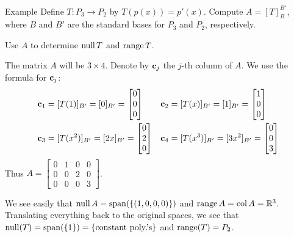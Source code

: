 \begin{frame}{Example}
Define $T\colon P_{3}\rightarrow P_{2}$ by $T(p(x))=p'(x)$. Compute $A=[T]_{B}^{B'}$, where $B$ and $B'$ are the standard bases for $P_3$ and $P_2$, respectively. 

Use $A$ to determine $\operatorname{null} T$ and $\operatorname{range} T $. 
\begin{bsolution}
The matrix $A$ will be $3\times 4$. Denote by ${\mathbf c}_j$ the $j$-th column of $A$. We use the formula for ${\mathbf c}_j$:
\begin{align*}
{\mathbf c}_1&=[T(1)]_{B'}=[0]_{B'}=\begin{bmatrix}
0\\ 0 \\ 0
\end{bmatrix} &
{\mathbf c}_2&=[T(x)]_{B'}=[1]_{B'}=\begin{bmatrix}
1\\ 0 \\ 0
\end{bmatrix}\\
{\mathbf c}_3&=[T(x^2)]_{B'}=[2x]_{B'}=\begin{bmatrix}
0\\ 2 \\ 0 
\end{bmatrix} &
{\mathbf c}_4&=[T(x^3)]_{B'}=[3x^2]_{B'}=\begin{bmatrix}
0\\ 0 \\ 3
\end{bmatrix}
\end{align*}
\pause Thus $A=\begin{bmatrix}
0&1&0&0\\ 0&0&2&0\\ 0&0&0&3
\end{bmatrix}$. 

\pause We see easily that $\operatorname{null} A =\operatorname{span}(\{(1,0,0,0)\})$ and $\operatorname{range} A=\operatorname{col} A={\mathbb R}^3$. Translating everything back to the original spaces, we see that $\operatorname{null}(T)=\operatorname{span}(\{1\})=\{\text{constant poly.'s}\}$ and $\operatorname{range}(T)=P_2$. 
\end{bsolution}
\end{frame}
